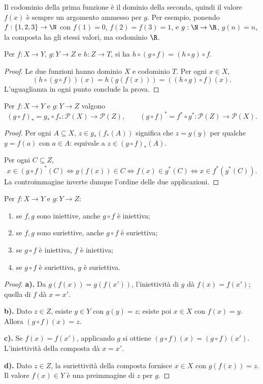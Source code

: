 Il codominio della prima funzione è il dominio della seconda, quindi il valore $f(x)$ è sempre un argomento ammesso per $g$. Per esempio, ponendo $f:\{1,2,3\}\to\N$ con $f(1)=0$, $f(2)=f(3)=1$, e $g:\N\to\R$, $g(n)=n$, la composta ha gli stessi valori, ma codominio $\R$.

\begin{proposizione}[Associatività]
Per $f:X\to Y$, $g:Y\to Z$ e $h:Z\to T$, si ha $h\circ(g\circ f)=(h\circ g)\circ f$.
\end{proposizione}
\begin{proof}
Le due funzioni hanno dominio $X$ e codominio $T$. Per ogni $x\in X$,
\[
(h\circ(g\circ f))(x)=h(g(f(x)))=((h\circ g)\circ f)(x).
\]
L'uguaglianza in ogni punto conclude la prova.
\end{proof}

\begin{proposizione}
Per $f:X\to Y$ e $g:Y\to Z$ valgono
\[
(g\circ f)_*=g_*\circ f_*:\mathcal P(X)\to\mathcal P(Z),\qquad
(g\circ f)^*=f^*\circ g^*:\mathcal P(Z)\to\mathcal P(X).
\]
\end{proposizione}
\begin{proof}
Per ogni $A\subseteq X$, $z\in g_*(f_*(A))$ significa che $z=g(y)$ per qualche $y=f(a)$ con $a\in A$: equivale a $z\in(g\circ f)_*(A)$.

Per ogni $C\subseteq Z$,
\[
x\in(g\circ f)^*(C)\iff g(f(x))\in C
\iff f(x)\in g^*(C)\iff x\in f^*(g^*(C)).
\]
La controimmagine inverte dunque l'ordine delle due applicazioni.
\end{proof}

\begin{proposizione}\label{prop:composte}
Per $f:X\to Y$ e $g:Y\to Z$:
\begin{enumerate}[label=\alph*)]
\item se $f,g$ sono iniettive, anche $g\circ f$ è iniettiva;
\item se $f,g$ sono suriettive, anche $g\circ f$ è suriettiva;
\item se $g\circ f$ è iniettiva, $f$ è iniettiva;
\item se $g\circ f$ è suriettiva, $g$ è suriettiva.
\end{enumerate}
\end{proposizione}
\begin{proof}
\textbf{a).} Da $g(f(x))=g(f(x'))$, l'iniettività di $g$ dà $f(x)=f(x')$; quella di $f$ dà $x=x'$.

\textbf{b).} Dato $z\in Z$, esiste $y\in Y$ con $g(y)=z$; esiste poi $x\in X$ con $f(x)=y$. Allora $(g\circ f)(x)=z$.

\textbf{c).} Se $f(x)=f(x')$, applicando $g$ si ottiene $(g\circ f)(x)=(g\circ f)(x')$. L'iniettività della composta dà $x=x'$.

\textbf{d).} Dato $z\in Z$, la suriettività della composta fornisce $x\in X$ con $g(f(x))=z$. Il valore $f(x)\in Y$ è una preimmagine di $z$ per $g$.
\end{proof}

